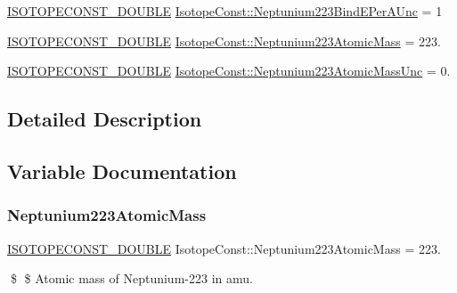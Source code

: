 \begin{DoxyCompactItemize}
\mbox{\hyperlink{group___isotope_const-_macros_ga8f45a7272ce02c0b4c65c44636ed719a}{I\+S\+O\+T\+O\+P\+E\+C\+O\+N\+S\+T\+\_\+\+D\+O\+U\+B\+LE}} \mbox{\hyperlink{group___isotope_const-_neptunium-_np223_gad3c947306aeb5cc5cce028e7a5db6c2b}{Isotope\+Const\+::\+Neptunium223\+Bind\+E\+Per\+A\+Unc}} = 1
\item 
\mbox{\hyperlink{group___isotope_const-_macros_ga8f45a7272ce02c0b4c65c44636ed719a}{I\+S\+O\+T\+O\+P\+E\+C\+O\+N\+S\+T\+\_\+\+D\+O\+U\+B\+LE}} \mbox{\hyperlink{group___isotope_const-_neptunium-_np223_ga31139506f2a398a082bd4ef25347519a}{Isotope\+Const\+::\+Neptunium223\+Atomic\+Mass}} = 223.
\item 
\mbox{\hyperlink{group___isotope_const-_macros_ga8f45a7272ce02c0b4c65c44636ed719a}{I\+S\+O\+T\+O\+P\+E\+C\+O\+N\+S\+T\+\_\+\+D\+O\+U\+B\+LE}} \mbox{\hyperlink{group___isotope_const-_neptunium-_np223_ga5344c9c3303f17e8e7995bbd4a3c89b0}{Isotope\+Const\+::\+Neptunium223\+Atomic\+Mass\+Unc}} = 0.
\end{DoxyCompactItemize}


\subsection{Detailed Description}


\subsection{Variable Documentation}
\mbox{\label{group___isotope_const-_neptunium-_np223_ga31139506f2a398a082bd4ef25347519a}} 
\subsubsection{\texorpdfstring{Neptunium223\+Atomic\+Mass}{Neptunium223AtomicMass}}
{\footnotesize\ttfamily \mbox{\hyperlink{group___isotope_const-_macros_ga8f45a7272ce02c0b4c65c44636ed719a}{I\+S\+O\+T\+O\+P\+E\+C\+O\+N\+S\+T\+\_\+\+D\+O\+U\+B\+LE}} Isotope\+Const\+::\+Neptunium223\+Atomic\+Mass = 223.}

\$ \$ Atomic mass of Neptunium-\/223 in amu. \mbox{\label{group___isotope_const-_neptunium-_np223_ga5344c9c3303f17e8e7995bbd4a3c89b0}} 
